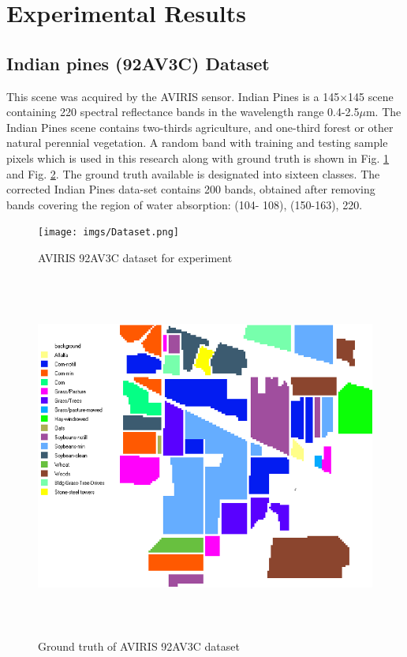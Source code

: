 \documentclass[document.tex]{subfiles}
\begin{document}
\section{Experimental Results}
\subsection{Indian pines (92AV3C) Dataset}
\noindent This scene was acquired by the AVIRIS sensor. Indian Pines is a 145$\times$145 scene containing
220 spectral reflectance bands in the wavelength range 0.4-2.5$\mu$m. The Indian Pines scene
contains two-thirds agriculture, and one-third forest or other natural perennial vegetation.
A random band with training and testing sample pixels which is used in this research along with ground truth is shown in Fig. \ref{fig:AVIRIS 92AV3C dataset for experiment} and Fig. \ref{fig:Ground truth of AVIRIS 92AV3C dataset}. The ground truth
available is designated into sixteen classes. The corrected Indian Pines data-set contains
200 bands, obtained after removing bands covering the region of water absorption: (104-
108), (150-163), 220.
\begin{figure}[H]
	\begin{center}
		\texttt{[image: imgs/Dataset.png]}
	\end{center}
	\caption{AVIRIS 92AV3C dataset for experiment}
	\label{fig:AVIRIS 92AV3C dataset for experiment}
\end{figure}

\begin{figure}[H]
	\begin{center}
		\includegraphics[height=12.0cm]{imgs/Ground.png}
	\end{center}
	\caption{Ground truth of AVIRIS 92AV3C dataset}
	\label{fig:Ground truth of AVIRIS 92AV3C dataset}
\end{figure}
\end{document}
